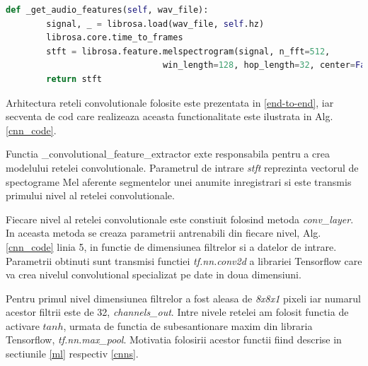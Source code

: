 \documentclass[a4paper,12pt]{book}
\begin{document}
				\begin{lstlisting}[language=Python, caption={Extragerea spectogramei Mel, 3.4.1, folosind libraria librosa.}, xleftmargin=0cm]
  def _get_audio_features(self, wav_file):
		signal, _ = librosa.load(wav_file, self.hz)
		librosa.core.time_to_frames
		stft = librosa.feature.melspectrogram(signal, n_fft=512, 
							   win_length=128, hop_length=32, center=False)
		return stft	\end{lstlisting} \par
				Arhitectura reteli convolutionale folosite este prezentata in \ref{end-to-end}, iar secventa de cod care realizeaza aceasta functionalitate este ilustrata in Alg. \ref{cnn_code}. \par 
				Functia \_convolutional\_feature\_extractor exte responsabila pentru a crea modelului retelei convolutionale. Parametrul de intrare \textit{stft} reprezinta vectorul de spectograme Mel aferente segmentelor unei anumite inregistrari si este transmis primului nivel al retelei convolutionale. \par
				Fiecare nivel al retelei convolutionale este constiuit folosind metoda \textit{conv\_layer}. In aceasta metoda se creaza parametrii antrenabili din fiecare nivel, Alg.\ref{cnn_code} linia 5, in functie de dimensiunea filtrelor si a datelor de intrare. Parametrii obtinuti sunt transmisi functiei \textit{tf.nn.conv2d} a librariei Tensorflow care va crea nivelul convolutional specializat pe date in doua dimensiuni. \par
				Pentru primul nivel dimensiunea filtrelor a fost aleasa de \textit{8x8x1} pixeli iar numarul acestor filtrii este de 32, \textit{channels\_out}. Intre nivele retelei am folosit functia de activare $tanh$, urmata de functia de subesantionare maxim din libraria Tensorflow, \textit{tf.nn.max\_pool}. Motivatia folosirii acestor functii fiind descrise in sectiunile \ref{ml} respectiv \ref{cnns}.
				
\end{document}
